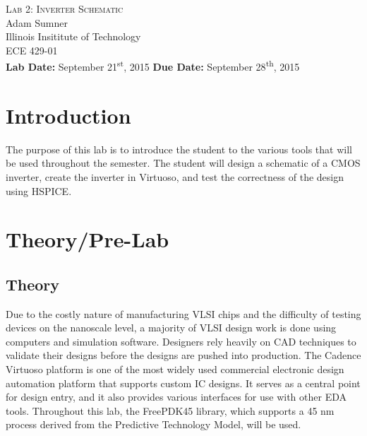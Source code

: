 \documentclass[12pt]{article}
\begin{document}
\begin{titlepage}
	\begin{center}
		
		
		\vfill
		
		\textsc{\LARGE Lab 2: Inverter Schematic}\\[1.5cm]
		
		\Large Adam Sumner\\[0.5cm]
		
		\Large Illinois Insititute of Technology\\[0.5cm]
		
		\Large ECE 429-01\\[0.5cm]	
		
		\noindent
		\vfill
		\large \textbf{Lab Date:} September 21\textsuperscript{st}, 2015\hfill
		\large \textbf{Due Date:} September 28\textsuperscript{th}, 2015
		
		
	\end{center}
\end{titlepage}

\section{Introduction}
The purpose of this lab is to introduce the student to the various tools that will be used throughout the semester. The student will design a schematic of a CMOS inverter, create the inverter in Virtuoso, and test the correctness of the design using HSPICE.

\section{Theory/Pre-Lab}
\subsection{Theory}
Due to the costly nature of manufacturing VLSI chips and the difficulty of testing devices on the nanoscale level, a majority of VLSI design work is done using computers and simulation  software. Designers rely heavily on CAD techniques to validate their designs before the designs are pushed into production. The Cadence Virtuoso platform is one of the most widely used commercial electronic design automation platform that supports custom IC designs. It serves as a central point for design entry, and it also provides various interfaces for use with other EDA tools. Throughout this lab, the FreePDK45 library, which supports a 45 nm process derived from the Predictive Technology Model, will be used.
\end{document}
